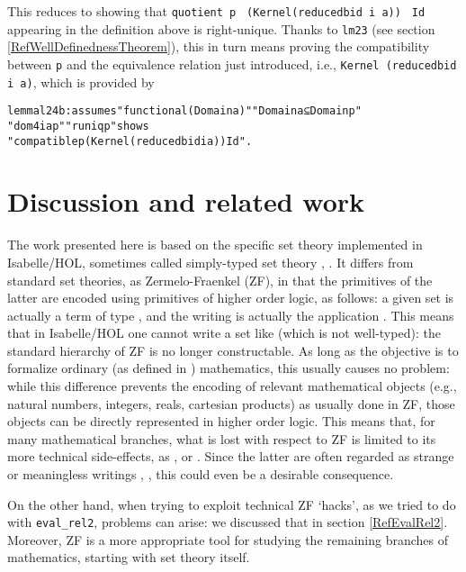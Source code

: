 \documentclass[
]{llncs}
\newenvironment{mytable}{
\vspace{0.2ex}
\begin{center}\begin{minipage}
{0.9\textwidth}\renewcommand{\baselinestretch}{0.75}\begin{small}}
{\end{small}\end{minipage}\end{center}
\vspace{0.1ex}
}
\newcommand{\hol}{higher order logic}
\newcommand{\Hol}{HOL}
\newcommand{\I}{Isabelle}
\begin{document}
This reduces to showing that 
\verb|quotient p |
\verb|(Kernel(reducedbid i a))|
\verb| Id| appearing in the definition above is right-unique. 
Thanks to \verb|lm23| (see section \ref{RefWellDefinednessTheorem}), this in turn means proving the compatibility between \verb|p| and the equivalence relation just introduced, i.e., \verb|Kernel (reducedbid i a)|, 
which is provided by 
\begin{mytable}
\begin{alltt}
lemma l24b: assumes "functional (Domain a)" "Domain a ⊆ Domain p" 
"dom4 i a p" "runiq p" shows 
"compatible p (Kernel (reducedbid i a)) Id".
\end{alltt}
\end{mytable}

\section{Discussion and related work}
\label{RefSetTheory}
\label{RefRelatedWork}
The work presented here is based on the specific set theory implemented in \I{}/HOL, sometimes called simply-typed set theory \cite[Section~6.1]{paulson2013proof}, \cite[Section~1]{Paulson:stfv93}.
It differs from standard set theories, as Zermelo-Fraenkel (ZF), in that the primitives of the latter are encoded using primitives of \hol{}, as follows: a given set  is actually a term  of type , and the writing  is actually the application .
This means that in \I/\Hol{} one cannot write a set like  (which is not well-typed): the standard hierarchy of ZF is no longer constructable.
As long as the objective is to formalize ordinary 
(as defined in \cite[Section~I.1]{simpson2009subsystems}) mathematics, this usually causes no problem:
while this difference prevents the encoding of relevant mathematical objects (e.g., natural numbers, integers, reals, cartesian products) as usually done in ZF, those objects can be directly represented in \hol{}.
This means that, for many mathematical branches, what is lost with respect to ZF is limited to its more technical side-effects, as , or .
Since the latter are often regarded as strange or meaningless writings \cite{leinster2012rethinking}, \cite[Section~1]{Paulson:stfv93}, this could even be a desirable consequence.

On the other hand, when trying to exploit technical ZF `hacks{}', as we tried to do with \verb|eval_rel2|, problems can arise: we discussed that in section \ref{RefEvalRel2}.
Moreover, ZF is a more appropriate tool for studying the remaining branches of mathematics, starting with set theory itself.
\end{document}
